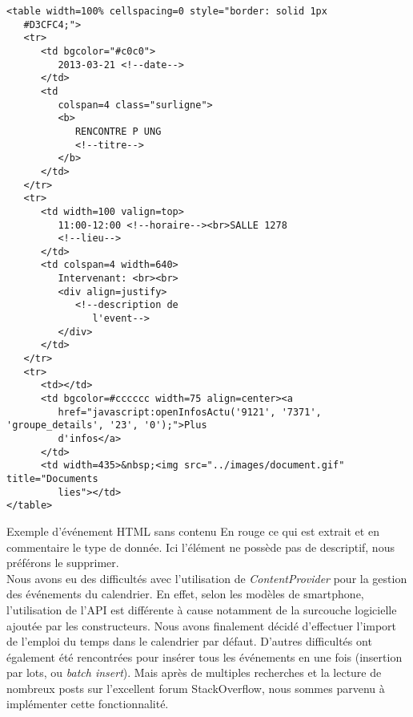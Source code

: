 \begin{adjustbox}{minipage=1.14\textwidth,margin=0pt \smallskipamount,center}
\begin{lstlisting}[style=XML, label=htmlCode]
<table width=100% cellspacing=0 style="border: solid 1px 
   #D3CFC4;">
   <tr>
      <td bgcolor="#c0c0">
         2013-03-21 <!--date-->
      </td>
      <td
         colspan=4 class="surligne">
         <b>
            RENCONTRE P UNG
            <!--titre-->
         </b>
      </td>
   </tr>
   <tr>
      <td width=100 valign=top>
         11:00-12:00 <!--horaire--><br>SALLE 1278
         <!--lieu-->
      </td>
      <td colspan=4 width=640>
         Intervenant: <br><br>
         <div align=justify>
            <!--description de
               l'event-->
         </div>
      </td>
   </tr>
   <tr>
      <td></td>
      <td bgcolor=#cccccc width=75 align=center><a
         href="javascript:openInfosActu('9121', '7371', 'groupe_details', '23', '0');">Plus
         d'infos</a>
      </td>
      <td width=435>&nbsp;<img src="../images/document.gif" title="Documents 
         lies"></td>
</table>
\end{lstlisting}
\end{adjustbox}

Exemple d'événement HTML sans contenu
En rouge ce qui est extrait et en commentaire le type de donnée. Ici l’élément ne possède pas de descriptif, nous préférons le supprimer. \\

Nous avons eu des difficultés avec l’utilisation de \emph{ContentProvider} pour la gestion des événements du calendrier. En effet, selon les modèles de smartphone, l’utilisation de l’API est différente à cause notamment de la surcouche logicielle ajoutée par les constructeurs. Nous avons finalement décidé d’effectuer l’import de l’emploi du temps dans le calendrier par défaut. D’autres difficultés ont également été rencontrées pour insérer tous les événements en une fois (insertion par lots, ou \emph{batch insert}). Mais après de multiples recherches et la lecture de nombreux posts sur l’excellent forum StackOverflow, nous sommes parvenu à implémenter cette fonctionnalité.

